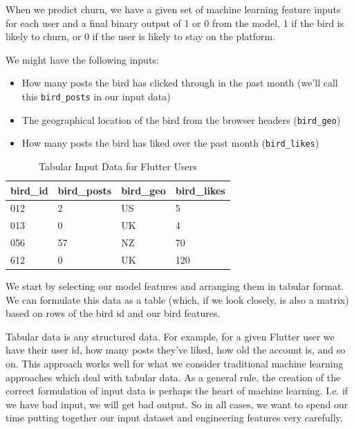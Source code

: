 \documentclass[11pt, table]{diazessay} %
\begin{document}
\begin{sloppypar}
When we predict churn, we have a given set of machine learning feature inputs for each user and a final binary output of 1 or 0 from the model, 1 if the bird is likely to churn, or 0 if the user is likely to stay on the platform.

We might have the following inputs:

\begin{itemize}
  \item How many posts the bird has clicked through in the past month (we'll call this \texttt{bird_posts} in our input data)
  \item The geographical location of the bird from the browser headers (\texttt{bird_geo})
  \item How many posts the bird has liked over the past month (\texttt{bird_likes})
\end{itemize}



\begin{table}[H]
  \centering
    \caption{Tabular Input Data for Flutter Users}
\begin{tabular}{|l|l|l|l|}
\hline
\rowcolor[HTML]{D5E7F7}
bird\_id & bird\_posts & bird\_geo & bird\_likes \\ \hline
012 	 & 2  		 & US   	 & 5  		 \\ \hline
013 	 & 0  		 & UK   	 & 4  		 \\ \hline
056 	 & 57 		 & NZ   	 & 70 		 \\ \hline
612 	 & 0  		 & UK   	 & 120		 \\ \hline
\end{tabular}
\end{table}

We start by selecting our model features and arranging them in tabular format.  We can formulate this data as a table (which, if we look closely, is also a matrix) based on rows of the bird id and our bird features.

Tabular data is any structured data. For example, for a given Flutter user we have their user id, how many posts they've liked, how old the account is, and so on. This approach works well for what we consider traditional machine learning approaches which deal with tabular data.  As a general rule, the creation of the correct formulation of input data is perhaps the heart of machine learning. I.e. if we have bad input, we will get bad output. So in all cases, we want to spend our time putting together our input dataset and engineering features very carefully.


\end{sloppypar}
\end{document}
